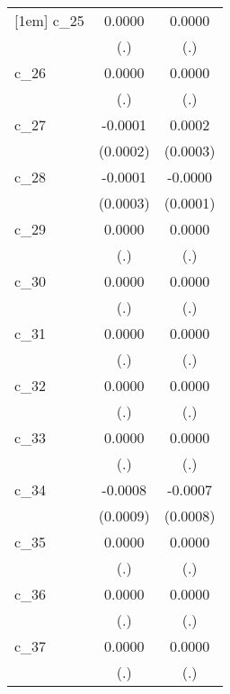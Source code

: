 {\begin{tabular}{l*{2}{c}}
[1em]
c\_25        &      0.0000        &      0.0000        \\
            &         (.)        &         (.)        \\
[1em]
c\_26        &      0.0000        &      0.0000        \\
            &         (.)        &         (.)        \\
[1em]
c\_27        &     -0.0001        &      0.0002        \\
            &    (0.0002)        &    (0.0003)        \\
[1em]
c\_28        &     -0.0001        &     -0.0000        \\
            &    (0.0003)        &    (0.0001)        \\
[1em]
c\_29        &      0.0000        &      0.0000        \\
            &         (.)        &         (.)        \\
[1em]
c\_30        &      0.0000        &      0.0000        \\
            &         (.)        &         (.)        \\
[1em]
c\_31        &      0.0000        &      0.0000        \\
            &         (.)        &         (.)        \\
[1em]
c\_32        &      0.0000        &      0.0000        \\
            &         (.)        &         (.)        \\
[1em]
c\_33        &      0.0000        &      0.0000        \\
            &         (.)        &         (.)        \\
[1em]
c\_34        &     -0.0008        &     -0.0007        \\
            &    (0.0009)        &    (0.0008)        \\
[1em]
c\_35        &      0.0000        &      0.0000        \\
            &         (.)        &         (.)        \\
[1em]
c\_36        &      0.0000        &      0.0000        \\
            &         (.)        &         (.)        \\
[1em]
c\_37        &      0.0000        &      0.0000        \\
            &         (.)        &         (.)        \\

\end{tabular}}
